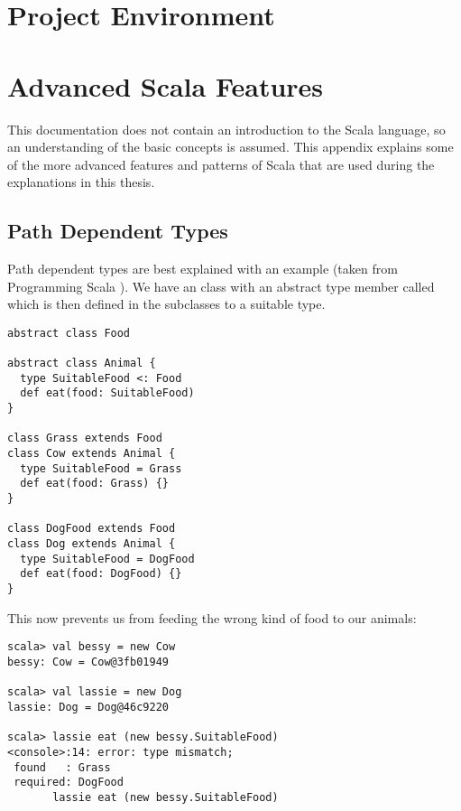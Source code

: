 \chapter{Project Environment} \label{chapter:project-environment}

\chapter{Advanced Scala Features} \label{chapter:advanced-scala-features}

This documentation does not contain an introduction to the Scala language, so an understanding of the basic concepts is assumed. This appendix explains some of the more advanced features and patterns of Scala that are used during the explanations in this thesis.

\section{Path Dependent Types} \label{section:path-dependent-types}

Path dependent types are best explained with an example (taken from Programming Scala \cite{ProgrammingScala}). We have an  class with an abstract type member called  which is then defined in the subclasses to a suitable type.
\begin{lstlisting}
abstract class Food

abstract class Animal {
  type SuitableFood <: Food
  def eat(food: SuitableFood)
}

class Grass extends Food
class Cow extends Animal {
  type SuitableFood = Grass
  def eat(food: Grass) {}
}

class DogFood extends Food
class Dog extends Animal {
  type SuitableFood = DogFood
  def eat(food: DogFood) {}
}
\end{lstlisting}

This now prevents us from feeding the wrong kind of food to our animals:

\begin{lstlisting}
scala> val bessy = new Cow
bessy: Cow = Cow@3fb01949

scala> val lassie = new Dog
lassie: Dog = Dog@46c9220

scala> lassie eat (new bessy.SuitableFood)
<console>:14: error: type mismatch;
 found   : Grass
 required: DogFood
       lassie eat (new bessy.SuitableFood)
\end{lstlisting}


